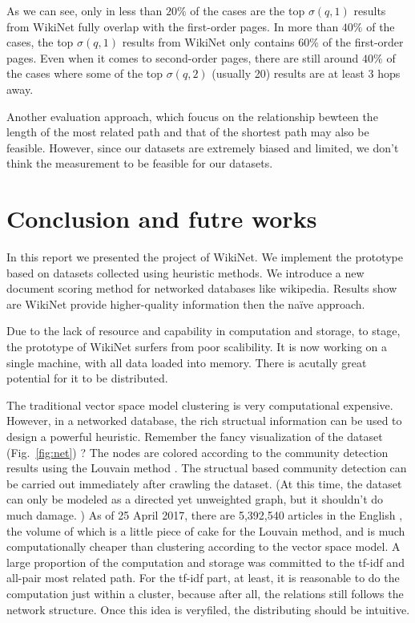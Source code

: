 \documentclass[12pt]{amsart}
\newcommand{\0}{\mat{0}}
\newcommand{\1}{\mathds{1}}
\begin{document}
As we can see, only in less than $20\%$ of the cases are the top $\sigma(q,1)$ results from WikiNet fully overlap with the first-order pages. In more than $40\%$ of the cases, the top $\sigma(q,1)$ results from WikiNet only contains $60\%$ of the first-order pages. Even when it comes to second-order pages, there are still around $40\%$ of the cases where some of the top $\sigma(q,2)$ (usually 20) results are at least $3$ hops away. 

Another evaluation approach, which foucus on the relationship bewteen the length of the most related path and that of the shortest path may also be feasible. However, since our datasets are extremely biased and limited, we don't think the measurement to be feasible for our datasets. 

\section{Conclusion and futre works}
\label{sec:con}
In this report we presented the project of WikiNet. We implement the prototype based on datasets collected using heuristic methods. We introduce a new document scoring method for networked databases like wikipedia. Results show are WikiNet provide higher-quality information then the na\"ive approach. 

Due to the lack of resource and capability in computation and storage, to stage, the prototype of WikiNet surfers from poor scalibility. It is now working on a single machine, with all data loaded into memory. There is acutally great potential for it to be distributed. 

The traditional vector space model clustering is very computational expensive. 
However, in a networked database, the rich structual information can be used to design a powerful heuristic. 
Remember the fancy visualization of the dataset (Fig.~\ref{fig:net}) ?
The nodes are colored according to the community detection results using the Louvain method \cite{blondel2008fast}. 
The structual based community detection can be carried out immediately after crawling the dataset. 
(At this time, the dataset can only be modeled as a directed yet unweighted graph, but it shouldn't do much damage. ) 
As of 25 April 2017, there are 5,392,540 articles in the English \cite{wikipedia2017size}, the volume of which is a little piece of cake for the Louvain method, and is much computationally cheaper than clustering according to the vector space model. 
A large proportion of the computation and storage was committed to the tf-idf and all-pair most related path. 
For the tf-idf part, at least, it is reasonable to do the computation just within a cluster, because after all, the relations still follows the network structure. Once this idea is veryfiled, the distributing should be intuitive. 
\end{document}
